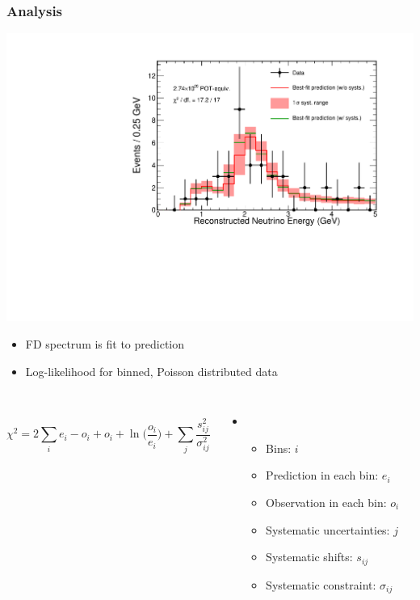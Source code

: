 \documentclass[10pt,professionalfonts,xcolor=table]{beamer}
\begin{document}
\begin{frame}
\frametitle{Analysis}
\begin{center}
\vspace{-10pt}
\includegraphics[width=.45\textheight, angle=-90]{figures/results/spectrum_fit_systs.pdf}
\end{center}

\begin{itemize}

\item FD spectrum is fit to prediction
\gap
\item Log-likelihood for binned, Poisson distributed data
\end{itemize}
\begin{columns}[c]
~
\begin{equation*}
\chi^2 = 2 \sum_i e_i - o_i + o_i + \ln \big (\frac{o_i}{e_i} \big)
+ \sum_j \frac{s_{ij}^2}{\sigma_{ij}^2} 
\end{equation*}
  \begin{itemize}
  \item[] ~
  \begin{itemize}
  \item Bins: $i$
  \item Prediction in each bin: $e_i$
  \item Observation in each bin: $o_i$
  \item Systematic uncertainties: $j$
  \item Systematic shifts: $s_{ij}$
  \item Systematic constraint: $\sigma_{ij}$
  \end{itemize}
  \end{itemize}
\end{columns}
\end{frame}
\end{document}
